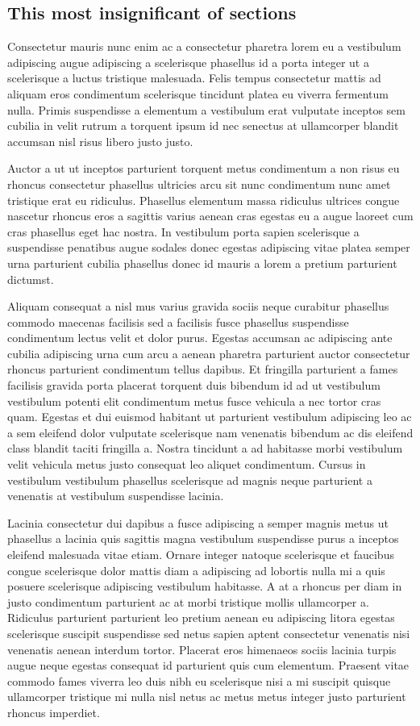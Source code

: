 \subsection{This most insignificant of sections}
Consectetur mauris nunc enim ac a consectetur pharetra lorem eu a vestibulum adipiscing augue adipiscing a scelerisque phasellus id a porta integer ut a scelerisque a luctus tristique malesuada. Felis tempus consectetur mattis ad aliquam eros condimentum scelerisque tincidunt platea eu viverra fermentum nulla. Primis suspendisse a elementum a vestibulum erat vulputate inceptos sem cubilia in velit rutrum a torquent ipsum id nec senectus at ullamcorper blandit accumsan nisl risus libero justo justo.
\par
Auctor a ut ut inceptos parturient torquent metus condimentum a non risus eu rhoncus consectetur phasellus ultricies arcu sit nunc condimentum nunc amet tristique erat eu ridiculus. Phasellus elementum massa ridiculus ultrices congue nascetur rhoncus eros a sagittis varius aenean cras egestas eu a augue laoreet cum cras phasellus eget hac nostra. In vestibulum porta sapien scelerisque a suspendisse penatibus augue sodales donec egestas adipiscing vitae platea semper urna parturient cubilia phasellus donec id mauris a lorem a pretium parturient dictumst.
\par
Aliquam consequat a nisl mus varius gravida sociis neque curabitur phasellus commodo maecenas facilisis sed a facilisis fusce phasellus suspendisse condimentum lectus velit et dolor purus. Egestas accumsan ac adipiscing ante cubilia adipiscing urna cum arcu a aenean pharetra parturient auctor consectetur rhoncus parturient condimentum tellus dapibus. Et fringilla parturient a fames facilisis gravida porta placerat torquent duis bibendum id ad ut vestibulum vestibulum potenti elit condimentum metus fusce vehicula a nec tortor cras quam. Egestas et dui euismod habitant ut parturient vestibulum adipiscing leo ac a sem eleifend dolor vulputate scelerisque nam venenatis bibendum ac dis eleifend class blandit taciti fringilla a. Nostra tincidunt a ad habitasse morbi vestibulum velit vehicula metus justo consequat leo aliquet condimentum. Cursus in vestibulum vestibulum phasellus scelerisque ad magnis neque parturient a venenatis at vestibulum suspendisse lacinia.
\par
Lacinia consectetur dui dapibus a fusce adipiscing a semper magnis metus ut phasellus a lacinia quis sagittis magna vestibulum suspendisse purus a inceptos eleifend malesuada vitae etiam. Ornare integer natoque scelerisque et faucibus congue scelerisque dolor mattis diam a adipiscing ad lobortis nulla mi a quis posuere scelerisque adipiscing vestibulum habitasse. A at a rhoncus per diam in justo condimentum parturient ac at morbi tristique mollis ullamcorper a. Ridiculus parturient parturient leo pretium aenean eu adipiscing litora egestas scelerisque suscipit suspendisse sed netus sapien aptent consectetur venenatis nisi venenatis aenean interdum tortor. Placerat eros himenaeos sociis lacinia turpis augue neque egestas consequat id parturient quis cum elementum. Praesent vitae commodo fames viverra leo duis nibh eu scelerisque nisi a mi suscipit quisque ullamcorper tristique mi nulla nisl netus ac metus metus integer justo parturient rhoncus imperdiet.
